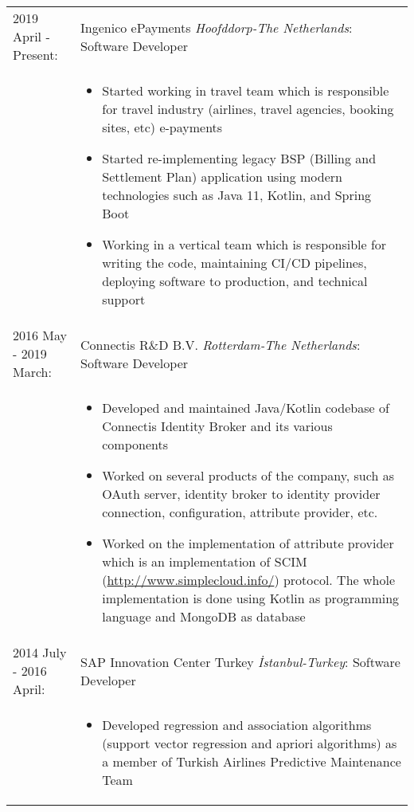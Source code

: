 \documentclass[11pt]{article}
\begin{document}
\begin{tabular}{p{5.5cm} p{12.5cm}}
\\
2019 April - Present:        & Ingenico ePayments \textit{Hoofddorp-The Netherlands}: Software Developer \\
							 & 
\begin{itemize}
\setlength\itemsep{0em}
\vspace{-15pt}
\item Started working in travel team which is responsible for travel industry (airlines, travel agencies, booking sites, etc) e-payments
\item Started re-implementing legacy BSP (Billing and Settlement Plan) application using modern technologies such as Java 11, Kotlin, and Spring Boot
\item Working in a vertical team which is responsible for writing the code, maintaining CI/CD pipelines, deploying software to production, and technical support
\vspace{-10pt}
\end{itemize}\\
2016 May - 2019 March:       & Connectis R\&D B.V. \textit{Rotterdam-The Netherlands}: Software Developer \\
							 & 
\begin{itemize}
\setlength\itemsep{0em}
\vspace{-15pt}
\item Developed and maintained Java/Kotlin codebase of Connectis Identity Broker and its various components
\item Worked on several products of the company, such as OAuth server, identity broker to identity provider connection, configuration, attribute provider, etc.
\item Worked on the implementation of attribute provider which is an implementation of SCIM (\url{http://www.simplecloud.info/}) protocol. The whole implementation is done using Kotlin as programming language and MongoDB as database
\vspace{-10pt}
\end{itemize}\\
2014 July - 2016 April:      & SAP Innovation Center Turkey \textit{\.{I}stanbul-Turkey}: Software Developer \\
							 & 
\begin{itemize}
\setlength\itemsep{0em}
\vspace{-15pt}
\item Developed regression and association algorithms (support vector regression and apriori algorithms) as a member of Turkish Airlines Predictive Maintenance Team

\end{itemize}
\end{tabular}
\end{document}

